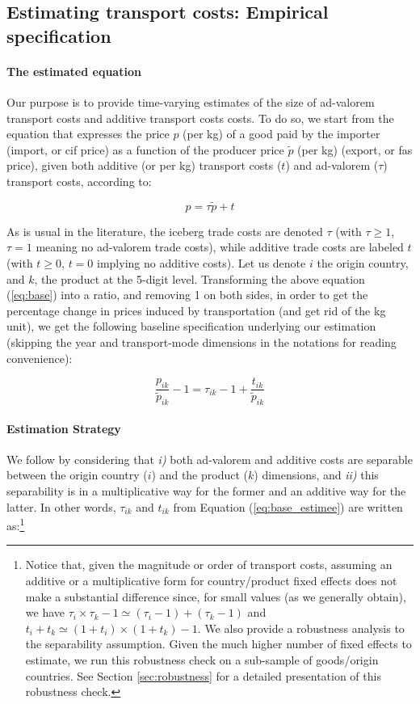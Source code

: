 \documentclass[a4paper,11pt]{article}
\begin{document}
\subsection{Estimating transport costs: Empirical specification}

\paragraph{The estimated equation} Our purpose is to provide time-varying estimates of the size of ad-valorem transport costs and additive transport costs costs.
To do so, we start from the equation that expresses the price $p$ (per kg) of a good paid by the importer (import, or cif price) as a function of the producer price $\widetilde{p}$ (per kg) (export, or fas price), given both additive (or per kg) transport costs ($t$) and ad-valorem ($\tau$) transport costs, according to:

\begin{equation}
p = \tau \widetilde{p}+ t \label{eq:base}
\end{equation}

\noindent As is usual in the literature, the iceberg trade costs are denoted $\tau$ (with  $\tau \geq 1$, $\tau=1$ meaning no ad-valorem trade costs), while additive trade costs are labeled $t$ (with $t \geq 0$, $t=0$ implying no additive costs).
 Let us denote $i$ the origin country, and $k$, the product at the 5-digit level.
Transforming the above equation (\ref{eq:base}) into a ratio, and removing 1 on both sides, in order to get the percentage change in prices induced by transportation (and get rid of the kg unit), we get the following baseline specification underlying our estimation (skipping the year and transport-mode dimensions in the notations for reading convenience):

\begin{equation}
\frac{p_{ik}}{\widetilde{p}_{ik}} -1 = \tau_{ik} -1 +\frac{t_{ik}}{ \widetilde{p}_{ik}} \label{eq:base_estimee}
\end{equation}

\paragraph{Estimation Strategy} We follow \citet{Irrazabal_2015} by considering that \textit{i)} both ad-valorem and additive costs are separable between the origin country ($i$) and the product ($k$) dimensions, and \textit{ii)} this separability is in a multiplicative way for the former and an additive way for the latter.
In other words, $\tau_{ik}$ and $t_{ik}$ from Equation (\ref{eq:base_estimee}) are written as:\footnote{Notice that, given the magnitude or order of transport costs, assuming an additive or a multiplicative form for country/product fixed effects does not make a substantial difference since, for small values (as we generally obtain), we have $\tau_i\times \tau_k -1 \simeq (\tau_i-1) + (\tau_k -1)$ and $t_i+t_k\simeq (1+t_i)\times(1+t_k)-1$.
We also provide a robustness analysis to the separability assumption.
Given the much higher number of fixed effects to estimate, we run this robustness check on a sub-sample of goods/origin countries.
See Section \ref{sec:robustness} for a detailed presentation of this robustness check.}
\end{document}

